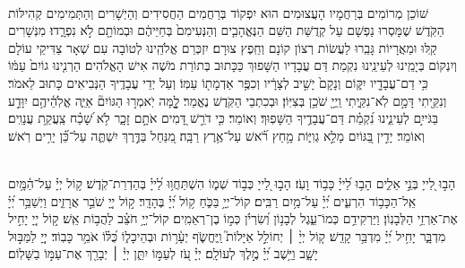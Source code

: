 \documentclass[twoside, openany, parskip=half, 11pt]{book}
\begin{document}
\\
שׁוֹכֵן מְרוֹמִים בְּרַחֲמָיו הָעֲצוּמִים הוּא יִפְקוֹד בְּרַחֲמִים הַחֲסִידִים וְהַיְשָׁרִים וְהַתְּמִימִים קְהִילּוֹת הַקֹּֽדֶשׁ שֶׁמָּסְרוּ נַפְשָׁם עַל קְדֻשַּׁת הַשֵּׁם הַנֶּאֱהָבִ֤ים וְהַנְּעִימִם֙ בְּחַיֵּיהֶ֔ם וּבְמוֹתָ֖ם לֹ֣א נִפְרָ֑דוּ׃ מִנְּשָׁרִים קַֽלּוּ וּמֵאֲרָיוֹת גָּבֵֽרוּ לַעֲשׂוֹת רְצוֹן קוֹנָם וְחֵֽפֶץ צוּרָם׃ יִזְכְּרֵם אֱלֹהֵֽינוּ לְטוֹבָה עִם שְׁאָר צַדִּיקֵי עוֹלָם וְיִנְקוֹם בְּיָמֵֽינוּ לְעֵינֵֽינוּ נִקְמַת דַּם עֲבָדָיו הַשָּׁפוּךְ כַּכָּתוּב בְּתוֹרַת מֹשֶׁה אִישׁ הָאֱלֹהִים׃ הַרְנִ֤ינוּ גוֹיִם֙ עַמּ֔וֹ כִּ֥י דַם־עֲבָדָ֖יו יִקּ֑וֹם וְנָקָם֙ יָשִׁ֣יב לְצָרָ֔יו וְכִפֶּ֥ר אַדְמָת֖וֹ עַמּֽוֹ׃ וְעַל יְדֵי עֲבָדֶֽיךָ הַנְּבִיאִים כָּתוּב לֵאמֹר׃ וְנִקֵּ֖יתִי דָּמָ֣ם לֹֽא־נִקֵּ֑יתִי וַֽיְיָ֖ שֹׁכֵ֥ן בְּצִיּֽוֹן׃ וּבְכִתְבֵי הַקֹּֽדֶשׁ נֶאֱמַר׃ לׇׇׇ֤מָּה יֹֽאמְר֣וּ הַגּוֹיִם֘ אַיֵּ֢ה אֱלֹֽהֵ֫יהֶ֥ם יִוָּדַ֣ע בַּגֹּייִ֣ם לְעֵינֵ֑ינוּ נִ֝קְמַ֗ת דַּם־עֲבָדֶ֥יךָ הַשָּׁפֽוּךְ׃ וְאוֹמֵר׃ כִּ֤י דֹרֵ֣שׁ דָּ֭מִים אֹתָ֣ם זָכָ֑ר לֹ֥א שָׁ֝כַ֗ח צַֽעֲקַ֥ת עֲנָוִֽים׃ וְאוֹמֵר׃ יָדִ֣ין בַּ֭גּוֹיִם מָלֵ֣א גְוִיּ֑וֹת מָ֥חַץ רֹ֝֗אשׁ עַל־אֶ֥רֶץ רַבָּֽה׃ מִ֭נַּחַל בַּדֶּ֣רֶךְ יִשְׁתֶּ֑ה עַל־כֵּ֝֗ן יָרִ֥ים רֹֽאשׁ׃



\sepline

\ashrei

\yehalelu

\\
%
הָב֣וּ לַ֭ייָ בְּנֵ֣י אֵלִ֑ים הָב֥וּ לַ֝ייָ֗ כָּב֥וֹד וָעֹֽז׃
הָב֣וּ לַ֭ייָ כְּב֣וֹד שְׁמ֑וֹ הִשְׁתַּחֲו֥וּ לַ֝ייָ֗ בְּהַדְרַת־קֹֽדֶשׁ׃
ק֥וֹל יְיָ֗ עַל־הַ֫מָּ֥יִם אֵֽל־הַכָּב֥וֹד הִרְעִ֑ים יְ֝יָ֗ עַל־מַ֥יִם רַבִּֽים׃
קוֹל־יְיָ֥ בַּכֹּ֑חַ ק֥וֹל יְ֝יָ֗ בֶּהָדָֽר׃
ק֣וֹל יְיָ֭ שֹׁבֵ֣ר אֲרָזִ֑ים וַיְשַׁבֵּ֥ר יְ֝יָ֗ אֶת־אַרְזֵ֥י הַלְּבָנֽוֹן׃
וַיַּרְקִידֵ֥ם כְּמוֹ־עֵ֑גֶל לְבָנ֥וֹן וְ֝שִׂרְיֹ֗ן כְּמ֣וֹ בֶן־רְאֵמִֽים׃
קוֹל־יְיָ֥ חֹצֵ֗ב לַהֲב֥וֹת אֵֽשׁ׃
ק֣וֹל יְיָ֭ יָחִ֣יל מִדְבָּ֑ר יָחִ֥יל יְ֝יָ֗ מִדְבַּ֥ר קָדֵֽשׁ׃
ק֤וֹל יְיָ֨ ׀ יְחוֹלֵ֣ל אַיָּלוֹת֮ וַֽיֶּחֱשֹׂ֢ף יְעָ֫ר֥וֹת וּבְהֵיכָל֑וֹ כֻּ֝לּ֗וֹ אֹמֵ֥ר כָּבֽוֹד׃
יְיָ֭ לַמַּבּ֣וּל יָשָׁ֑ב וַיֵּ֥שֶׁב יְ֝יָ֗ מֶ֣לֶךְ לְעוֹלָֽם׃
יְיָ֗ עֹ֭ז לְעַמּ֣וֹ יִתֵּ֑ן יְיָ֓ ׀ יְבָרֵ֖ךְ אֶת־עַמּ֣וֹ בַשָּׁלֽוֹם׃

\begin{sometimes}

\\
\kafdalet

\end{sometimes}
\end{document}
